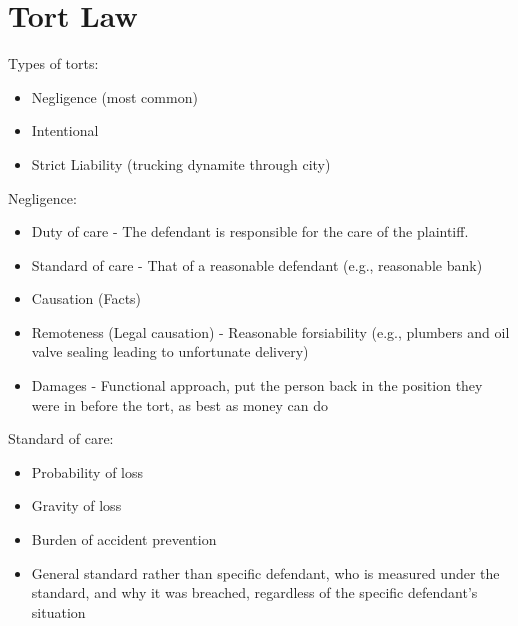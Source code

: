 \documentclass[
  letterpaper,
  landscape,
  columns=3,
  draft,
]{cheatsheet}
\begin{document}
  \section{Tort Law}
  Types of torts:
  \begin{itemize}
    \item Negligence (most common)
    \item Intentional
    \item Strict Liability (trucking dynamite through city)
  \end{itemize}
  Negligence:
  \begin{itemize}
    \item Duty of care - The defendant is responsible for the care of the plaintiff.
    \item Standard of care - That of a reasonable defendant (e.g., reasonable bank)
    \item Causation (Facts)
    \item Remoteness (Legal causation) - Reasonable forsiability (e.g., plumbers and oil valve sealing leading to unfortunate delivery)
    \item Damages - Functional approach, put the person back in the position they were in before the tort, as best as money can do
  \end{itemize}
  Standard of care:
  \begin{itemize}
    \item Probability of loss
    \item Gravity of loss
    \item Burden of accident prevention
    \item General standard rather than specific defendant, who is measured under the standard, and why it was breached, regardless of the specific defendant's situation
  \end{itemize}
\end{document}
